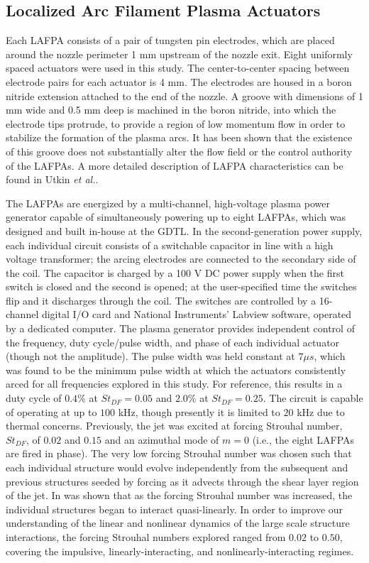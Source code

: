 \documentclass[english]{aiaa-tc}
\begin{document}
\subsection{Localized Arc Filament Plasma Actuators}\label{lafpa}
Each LAFPA consists of a pair of tungsten pin electrodes, which are placed around the nozzle perimeter 1 mm upstream of the nozzle exit. Eight uniformly spaced actuators were used in this study. The center-to-center spacing between electrode pairs for each actuator is 4 mm. The electrodes are housed in a boron nitride extension attached to the end of the nozzle. A groove with dimensions of 1 mm wide and 0.5 mm deep is machined in the boron nitride, into which the electrode tips protrude, to provide a region of low momentum flow in order to stabilize the formation of the plasma arcs. It has been shown that the existence of this groove does not substantially alter the flow field or the control authority of the LAFPAs\cite{hkfs-2011}. A more detailed description of LAFPA characteristics can be found in Utkin {\em et al.}\cite{uyg2007-1}.

The LAFPAs are energized by a multi-channel, high-voltage plasma power generator capable of simultaneously powering up to eight LAFPAs, which was designed and built in-house at the GDTL. In the second-generation power supply, each individual circuit consists of a switchable capacitor in line with a high voltage transformer; the arcing electrodes are connected to the secondary side of the coil. The capacitor is charged by a 100 V DC power supply when the first switch is closed and the second is opened; at the user-specified time the switches flip and it discharges through the coil. The switches are controlled by a 16-channel digital I/O card and National Instruments' Labview software, operated by a dedicated computer. The plasma generator provides independent control of the frequency, duty cycle/pulse width, and phase of each individual actuator (though not the amplitude). The pulse width was held constant at $7 \mu s$, which was found to be the minimum pulse width at which the actuators consistently arced for all frequencies explored in this study\cite{hkfs-2011}. For reference, this results in a duty cycle of $0.4\%$ at $St_{DF} = 0.05$ and $2.0\%$ at $St_{DF} = 0.25$. The circuit is capable of operating at up to $100$ kHz, though presently it is limited to $20$ kHz due to thermal concerns. Previously, the jet was excited at forcing Strouhal number, $St_{DF}$, of $0.02$ and $0.15$ and an azimuthal mode of $m = 0$ (i.e., the eight LAFPAs are fired in phase). The very low forcing Strouhal number was chosen such that each individual structure would evolve independently from the subsequent and previous structures seeded by forcing as it advects through the shear layer region of the jet. In was shown that as the forcing Strouhal number was increased, the individual structures began to interact quasi-linearly\cite{sinha2013}. In order to improve our understanding of the linear and nonlinear dynamics of the large scale structure interactions, the forcing Strouhal numbers explored ranged from $0.02$ to $0.50$, covering the impulsive, linearly-interacting, and nonlinearly-interacting regimes.
\end{document}
